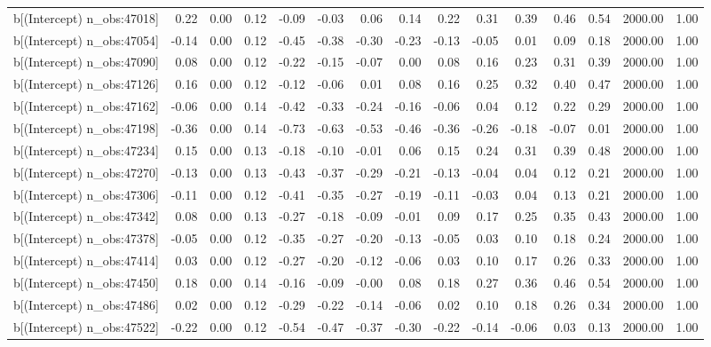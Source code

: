 \begin{table}[ht]
\begin{tabular}{rrrrrrrrrrrrrrr}
  b[(Intercept) n\_obs:47018] & 0.22 & 0.00 & 0.12 & -0.09 & -0.03 & 0.06 & 0.14 & 0.22 & 0.31 & 0.39 & 0.46 & 0.54 & 2000.00 & 1.00 \\ 
  b[(Intercept) n\_obs:47054] & -0.14 & 0.00 & 0.12 & -0.45 & -0.38 & -0.30 & -0.23 & -0.13 & -0.05 & 0.01 & 0.09 & 0.18 & 2000.00 & 1.00 \\ 
  b[(Intercept) n\_obs:47090] & 0.08 & 0.00 & 0.12 & -0.22 & -0.15 & -0.07 & 0.00 & 0.08 & 0.16 & 0.23 & 0.31 & 0.39 & 2000.00 & 1.00 \\ 
  b[(Intercept) n\_obs:47126] & 0.16 & 0.00 & 0.12 & -0.12 & -0.06 & 0.01 & 0.08 & 0.16 & 0.25 & 0.32 & 0.40 & 0.47 & 2000.00 & 1.00 \\ 
  b[(Intercept) n\_obs:47162] & -0.06 & 0.00 & 0.14 & -0.42 & -0.33 & -0.24 & -0.16 & -0.06 & 0.04 & 0.12 & 0.22 & 0.29 & 2000.00 & 1.00 \\ 
  b[(Intercept) n\_obs:47198] & -0.36 & 0.00 & 0.14 & -0.73 & -0.63 & -0.53 & -0.46 & -0.36 & -0.26 & -0.18 & -0.07 & 0.01 & 2000.00 & 1.00 \\ 
  b[(Intercept) n\_obs:47234] & 0.15 & 0.00 & 0.13 & -0.18 & -0.10 & -0.01 & 0.06 & 0.15 & 0.24 & 0.31 & 0.39 & 0.48 & 2000.00 & 1.00 \\ 
  b[(Intercept) n\_obs:47270] & -0.13 & 0.00 & 0.13 & -0.43 & -0.37 & -0.29 & -0.21 & -0.13 & -0.04 & 0.04 & 0.12 & 0.21 & 2000.00 & 1.00 \\ 
  b[(Intercept) n\_obs:47306] & -0.11 & 0.00 & 0.12 & -0.41 & -0.35 & -0.27 & -0.19 & -0.11 & -0.03 & 0.04 & 0.13 & 0.21 & 2000.00 & 1.00 \\ 
  b[(Intercept) n\_obs:47342] & 0.08 & 0.00 & 0.13 & -0.27 & -0.18 & -0.09 & -0.01 & 0.09 & 0.17 & 0.25 & 0.35 & 0.43 & 2000.00 & 1.00 \\ 
  b[(Intercept) n\_obs:47378] & -0.05 & 0.00 & 0.12 & -0.35 & -0.27 & -0.20 & -0.13 & -0.05 & 0.03 & 0.10 & 0.18 & 0.24 & 2000.00 & 1.00 \\ 
  b[(Intercept) n\_obs:47414] & 0.03 & 0.00 & 0.12 & -0.27 & -0.20 & -0.12 & -0.06 & 0.03 & 0.10 & 0.17 & 0.26 & 0.33 & 2000.00 & 1.00 \\ 
  b[(Intercept) n\_obs:47450] & 0.18 & 0.00 & 0.14 & -0.16 & -0.09 & -0.00 & 0.08 & 0.18 & 0.27 & 0.36 & 0.46 & 0.54 & 2000.00 & 1.00 \\ 
  b[(Intercept) n\_obs:47486] & 0.02 & 0.00 & 0.12 & -0.29 & -0.22 & -0.14 & -0.06 & 0.02 & 0.10 & 0.18 & 0.26 & 0.34 & 2000.00 & 1.00 \\ 
  b[(Intercept) n\_obs:47522] & -0.22 & 0.00 & 0.12 & -0.54 & -0.47 & -0.37 & -0.30 & -0.22 & -0.14 & -0.06 & 0.03 & 0.13 & 2000.00 & 1.00 \\ 

\end{tabular}
\end{table}
